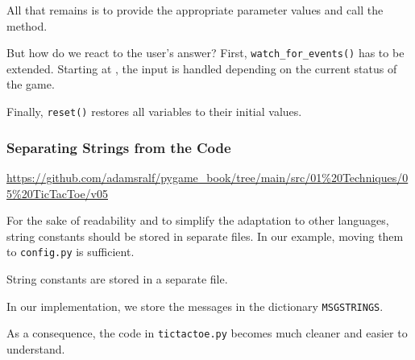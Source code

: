 All that remains is to provide the appropriate parameter values and call the method.



But how do we react to the user's answer? First, \texttt{watch\_for\_events()} has to be extended. Starting at , the input is handled depending on the current status of the game.

\newpage
{}

Finally, \texttt{reset()} restores all variables to their initial values.


\subsubsection{Separating Strings from the Code}
\begin{diskbox}
	\url{https://github.com/adamsralf/pygame_book/tree/main/src/01%20Techniques/05%20TicTacToe/v05}
\end{diskbox}

For the sake of readability and to simplify the adaptation to other languages, string constants should be stored in separate files. In our example, moving them to \texttt{config.py} is sufficient.

	String constants are stored in a separate file.
\er

In our implementation, we store the messages in the dictionary \texttt{MSGSTRINGS}.

\newpage
{}

As a consequence, the code in \texttt{tictactoe.py} becomes much cleaner and easier to understand.

